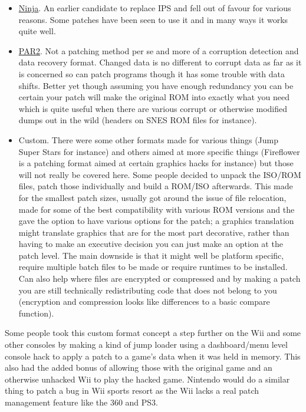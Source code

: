 \documentclass[
]{book}
\begin{document}
\begin{itemize}
\item
  \href{http://www.romhacking.net/utilities/329/}{Ninja}. An earlier candidate to replace IPS and fell out of favour for various reasons. Some patches have been seen to use it and in many ways it works quite well.
\item
  \href{http://www.quickpar.org.uk/}{PAR2}. Not a patching method per se and more of a corruption detection and data recovery format. Changed data is no different to corrupt data as far as it is concerned so can patch programs though it has some trouble with data shifts. Better yet though assuming you have enough redundancy you can be certain your patch will make the original ROM into exactly what you need which is quite useful when there are various corrupt or otherwise modified dumps out in the wild (headers on SNES ROM files for instance).
\item
  Custom. There were some other formats made for various things (Jump Super Stars for instance) and others aimed at more specific things (Fireflower is a patching format aimed at certain graphics hacks for instance) but those will not really be covered here. Some people decided to unpack the ISO/ROM files, patch those individually and build a ROM/ISO afterwards. This made for the smallest patch sizes, usually got around the issue of file relocation, made for some of the best compatibility with various ROM versions and the gave the option to have various options for the patch; a graphics translation might translate graphics that are for the most part decorative, rather than having to make an executive decision you can just make an option at the patch level. The main downside is that it might well be platform specific, require multiple batch files to be made or require runtimes to be installed. Can also help where files are encrypted or compressed and by making a patch you are still technically redistributing code that does not belong to you (encryption and compression looks like differences to a basic compare function).
\end{itemize}

Some people took this custom format concept a step further on the Wii and some other consoles by making a kind of jump loader using a dashboard/menu level console hack to apply a patch to a game's data when it was held in memory. This also had the added bonus of allowing those with the original game and an otherwise unhacked Wii to play the hacked game. Nintendo would do a similar thing to patch a bug in Wii sports resort as the Wii lacks a real patch management feature like the 360 and PS3.
\end{document}
